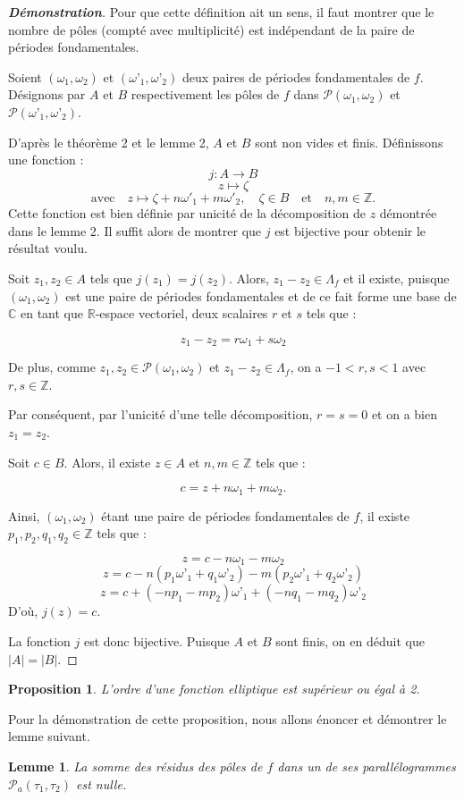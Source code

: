 \documentclass[12pt]{article}
\newtheorem{lemma}{Lemme}
\newtheorem{proposition}{Proposition}
\begin{document}
\begin{proof}[\textbf{Démonstration}]

Pour que cette définition ait un sens, il faut montrer que le nombre de pôles (compté avec multiplicité) est indépendant de la paire de périodes fondamentales.

Soient $(\omega_1, \omega_2)$ et $(\omega’_1, \omega’_2)$ deux paires de périodes fondamentales de $f$. Désignons par $A$ et $B$ respectivement les pôles de $f$ dans $\mathcal{P}(\omega_1, \omega_2)$ et $\mathcal{P}(\omega’_1, \omega’_2)$.

D’après le théorème 2 et le lemme 2, $A$ et $B$ sont non vides et finis. Définissons une fonction :
\[
j: A \rightarrow B
\]
\[
z \mapsto \zeta  
\]
\[
    \text{avec} \quad z \mapsto \zeta + n\omega'_1 + m\omega'_2, \quad \zeta \in B \quad \text{et} \quad n,m \in \mathbb{Z}.
    \] 
Cette fonction est bien définie par unicité de la décomposition de $z$ démontrée dans le lemme 2. Il suffit alors de montrer que $j$ est bijective pour obtenir le résultat voulu.

Soit $z_1, z_2 \in A$ tels que $j(z_1) = j(z_2)$. Alors, $z_1 - z_2 \in \Lambda_f$ et il existe, puisque $(\omega_1, \omega_2)$ est une paire de périodes fondamentales et de ce fait forme une base de $\mathbb{C}$ en tant que $\mathbb{R}$-espace vectoriel, deux scalaires $r$ et $s$ tels que :

\[ z_1 - z_2 = r\omega_1 + s\omega_2 \]

De plus, comme $z_1, z_2 \in \mathcal{P}(\omega_1, \omega_2)$ et $z_1 - z_2 \in \Lambda_f$, on a $-1 < r, s < 1$ avec $r, s \in \mathbb{Z}$.

Par conséquent, par l’unicité d’une telle décomposition, $r = s = 0$ et on a bien $z_1 = z_2$.

Soit $c \in B$. Alors, il existe $z \in A$ et $n, m \in \mathbb{Z}$ tels que :

\[ c = z + n\omega_1 + m\omega_2.\]

Ainsi, $(\omega_1, \omega_2)$ étant une paire de périodes fondamentales de $f$, il existe $p_1, p_2, q_1, q_2 \in \mathbb{Z}$ tels que :

\[ z = c -n \omega_1 - m \omega_2\]
\[ z = c - n(p_1\omega’_1 + q_1\omega’_2) - m(p_2\omega’_1 + q_2\omega’_2) \]
\[ z =  c + (-n p_1 - m p_2)\omega’_1 + (-n q_1 - m q_2)\omega’_2 \]
D’où, $j(z) = c$.

La fonction $j$ est donc bijective. Puisque $A$ et $B$ sont finis, on en déduit que $|A| = |B|$.
\end{proof}
\begin{proposition}
    L'ordre d'une fonction elliptique est supérieur ou égal à 2.
    \end{proposition}
    Pour la démonstration de cette proposition, nous allons énoncer et démontrer le lemme suivant.
    \begin{lemma}
    La somme des résidus des pôles de \( f \) dans un de ses parallélogrammes \( \mathcal{P}_a(\tau_1,\tau_2) \) est nulle.
    \end{lemma}
    
\end{document}
